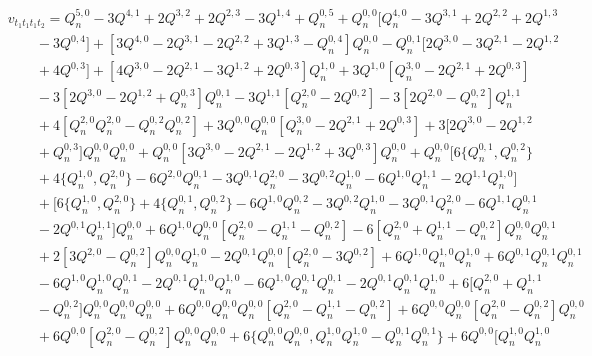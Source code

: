\documentclass[11p,reqno]{amsart}
\numberwithin{equation}{section}
\numberwithin{equation}{section}
\begin{document}
\begin{align*}
    &v_{t_1t_1t_1t_2} = Q_n^{5, 0} - 3Q^{4, 1} + 2Q^{3, 2} + 2Q^{2, 3} - 3Q^{1, 4} + Q_n^{0, 5} + Q_n^{0, 0}[Q_n^{4, 0} - 3Q^{3, 1} + 2Q^{2, 2} + 2Q^{1, 3} \\
    & \qquad - 3Q^{0, 4}] + [3Q^{4, 0} - 2Q^{3, 1} - 2Q^{2, 2} + 3Q^{1, 3} - Q_n^{0, 4}]Q_n^{0, 0} - Q_n^{0, 1}[2Q^{3, 0} - 3Q^{2, 1} - 2Q^{1, 2} \\
    & \qquad + 4Q^{0, 3}] + [4Q^{3, 0} - 2Q^{2, 1} - 3Q^{1, 2} + 2Q^{0, 3}]Q_n^{1, 0} + 3Q^{1, 0}[Q_n^{3, 0} - 2Q^{2, 1} + 2Q^{0, 3}] \\ 
    & \qquad - 3[2Q^{3, 0} - 2Q^{1, 2} + Q_n^{0, 3}]Q_n^{0, 1} - 3Q^{1, 1}[Q_n^{2, 0} - 2Q^{0, 2}] - 3[2Q^{2, 0} - Q_n^{0, 2}]Q_n^{1, 1} \\
    & \qquad + 4[Q_n^{2, 0}Q_n^{2, 0} - Q_n^{0, 2}Q_n^{0, 2}] + 3Q^{0, 0}Q_n^{0, 0}[Q_n^{3, 0} - 2Q^{2, 1} + 2Q^{0, 3}] + 3[2Q^{3, 0} - 2Q^{1, 2} \\ 
    & \qquad + Q_n^{0, 3}]Q_n^{0, 0}Q_n^{0, 0} + Q_n^{0, 0}[3Q^{3, 0} - 2Q^{2, 1} - 2Q^{1, 2} + 3Q^{0, 3}]Q_n^{0, 0} + Q_n^{0, 0}[6\{Q_n^{0, 1}, Q_n^{0, 2}\} \\ 
    & \qquad + 4\{Q_n^{1, 0}, Q_n^{2, 0}\} - 6Q^{2, 0}Q_n^{0, 1} - 3Q^{0, 1}Q_n^{2, 0} - 3Q^{0, 2}Q_n^{1, 0} - 6Q^{1, 0}Q_n^{1, 1} - 2Q^{1, 1}Q_n^{1, 0}] \\
    & \qquad + [6\{Q_n^{1, 0}, Q_n^{2, 0}\} + 4\{Q_n^{0, 1}, Q_n^{0, 2}\} - 6Q^{1, 0}Q_n^{0, 2} - 3Q^{0, 2}Q_n^{1, 0} - 3Q^{0, 1}Q_n^{2, 0} - 6Q^{1, 1}Q_n^{0, 1} \\
    & \qquad - 2Q^{0, 1}Q_n^{1, 1}]Q_n^{0, 0} + 6Q^{1, 0}Q_n^{0, 0}[Q_n^{2, 0} - Q_n^{1, 1} - Q_n^{0, 2}] - 6[Q_n^{2, 0} + Q_n^{1, 1} - Q_n^{0, 2}]Q_n^{0, 0}Q_n^{0, 1} \\ 
    & \qquad + 2[3Q^{2, 0} - Q_n^{0, 2}]Q_n^{0, 0}Q_n^{1, 0} - 2Q^{0, 1}Q_n^{0, 0}[Q_n^{2, 0} - 3Q^{0, 2}] + 6Q^{1, 0}Q_n^{1, 0}Q_n^{1, 0} + 6Q^{0, 1}Q_n^{0, 1}Q_n^{0, 1} \\ 
    & \qquad - 6Q^{1, 0}Q_n^{1, 0}Q_n^{0, 1} - 2Q^{0, 1}Q_n^{1, 0}Q_n^{1, 0} - 6Q^{1, 0}Q_n^{0, 1}Q_n^{0, 1} - 2Q^{0, 1}Q_n^{0, 1}Q_n^{1, 0} + 6[Q_n^{2, 0} + Q_n^{1, 1} \\ 
    & \qquad - Q_n^{0, 2}]Q_n^{0, 0}Q_n^{0, 0}Q_n^{0, 0} + 6Q^{0, 0}Q_n^{0, 0}Q_n^{0, 0}[Q_n^{2, 0} - Q_n^{1, 1} - Q_n^{0, 2}] + 6Q^{0, 0}Q_n^{0, 0}[Q_n^{2, 0} - Q_n^{0, 2}]Q_n^{0, 0} \\ 
    & \qquad + 6Q^{0, 0}[Q_n^{2, 0} - Q_n^{0, 2}]Q_n^{0, 0}Q_n^{0, 0} + 6\{Q_n^{0, 0}Q_n^{0, 0}, Q_n^{1, 0}Q_n^{1, 0} - Q_n^{0, 1}Q_n^{0, 1}\} + 6Q^{0, 0}[Q_n^{1, 0}Q_n^{1, 0} \\ 

\end{align*}
\end{document}
